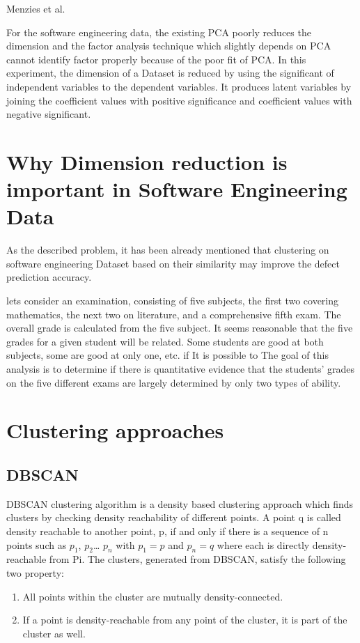 \documentclass[12pt]{report}
\begin{document}
Menzies et al. 


For the software engineering data, the existing PCA poorly reduces the dimension and the factor analysis technique which slightly depends on PCA cannot identify factor properly because of the poor fit of PCA. In this experiment, the dimension of a Dataset is reduced by using the significant of independent variables to the dependent variables. It produces latent variables by joining the coefficient values with positive significance and coefficient values with negative significant. 



\section{Why Dimension reduction is important in Software Engineering Data}

As the described problem, it has been already mentioned that clustering on software engineering Dataset based on their similarity may improve the defect prediction accuracy. 

lets consider an examination, consisting of five subjects, the first two covering mathematics, the next two on literature, and a comprehensive fifth exam. The overall grade is calculated from the five subject. It seems reasonable that the five grades for a given student will be related. Some students are good at both subjects, some are good at only one, etc. if It is possible to  The goal of this analysis is to determine if there is quantitative evidence that the students' grades on the five different exams are largely determined by only two types of ability.

  
\section{Clustering approaches}
 
\subsection{DBSCAN}
DBSCAN clustering algorithm is a density based clustering approach which finds clusters by checking density reachability of different points. A point q is called density reachable to another point, p, if and only if there is a sequence of n points such as $p_{1}$, $p_{2}$… $p_{n}$ with $p_{1}=p$ and $p_{n}=q$ where each is directly density-reachable from Pi. The clusters, generated from DBSCAN, satisfy the following two property:
\begin{enumerate}
	\item {All points within the cluster are mutually density-connected.}
	\item {If a point is density-reachable from any point of the cluster, it is part of the cluster as well.}
\end{enumerate}
	
\end{document}
